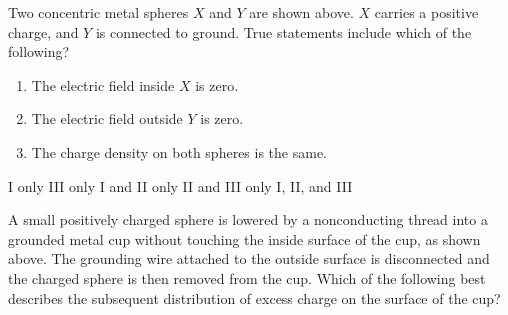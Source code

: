 \documentclass[12pt]{../../oss-classkick-exam}
\begin{document}
\begin{questions}
  \question Two concentric metal spheres $X$ and $Y$ are shown above. $X$
  carries a positive charge, and $Y$ is connected to ground. True statements
  include which of the following?

  \begin{minipage}{.3\linewidth}
  \end{minipage}
  \begin{minipage}{.5\linewidth}
    \vspace{.1in}
    \begin{enumerate}[nosep,label=\Roman*.]
    \item The electric field inside $X$ is zero.
    \item The electric field outside $Y$ is zero.
    \item The charge density on both spheres is the same.
    \end{enumerate}

    \vspace{.2in}\begin{choices}
      \choice I only
      \choice III only
      \choice I and II only
      \choice II and III only
      \choice I, II, and III
    \end{choices}
  \end{minipage}

  \uplevel{\rule{\linewidth}{.5pt}}

  \question A small positively charged sphere is lowered by a nonconducting
  thread into a grounded metal cup without touching the inside surface of the
  cup, as shown above. The grounding wire attached to the outside surface is
  disconnected and the charged sphere is then removed from the cup. Which of
  the following best describes the subsequent distribution of excess charge on
  the surface of the cup?


\end{questions}
\end{document}

